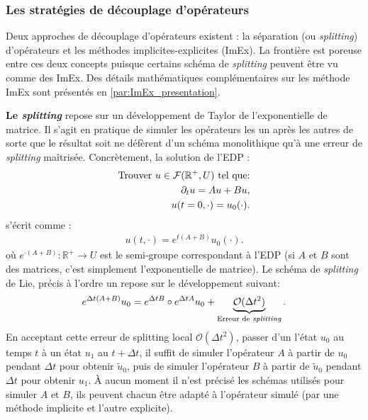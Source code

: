     \subsubsection{Les stratégies de découplage d'opérateurs}
        Deux approches de découplage d'opérateurs existent : la séparation (ou \textit{splitting}) d'opérateurs et les méthodes implicites-explicites (ImEx).
        La frontière est poreuse entre ces deux concepts puisque certains schéma de \textit{splitting} peuvent être vu comme des ImEx. 
        Des détails mathématiques complémentaires sur les méthode ImEx sont présentés en \ref{par:ImEx_presentation}.\par
        \textbf{Le \textit{splitting}} repose sur un développement de Taylor de l'exponentielle de matrice.
        Il s'agit en pratique de simuler les opérateurs les un après les autres de sorte que le résultat soit ne défèrent d'un schéma monolithique
        qu'à une erreur de \textit{splitting} maîtrisée.
        Concrètement, la solution de l'EDP :
        \begin{align}
            \notag\text{Trouver }u \in \mathcal F (\mathbb R^+,U) \text{ tel que:}\\
            \partial_t u = Au + Bu,\\\notag
            u(t=0,\cdot) = u_0(\cdot).
        \end{align}            
        s'écrit comme :
        \begin{align}
            u(t,\cdot) = e^{t(A+B)}u_0(\cdot).
        \end{align}
        où $e^{\cdot(A+B)} : \mathbb R^+ \rightarrow U$ est le semi-groupe correspondant à l'EDP (si $A$ et $B$ sont des matrices, c'est simplement l’exponentielle de matrice).
        Le schéma de \textit{splitting} de Lie, précis à l'ordre un repose sur le développement suivant:
        \begin{align}
            e^{\Delta t(A+B)}u_0 = e^{\Delta tB} \circ e^{\Delta tA}u_0 + \underbrace{\mathcal O (\Delta t^2)}_{\text{Erreur de \textit{splitting}}}.
        \end{align}
        En acceptant cette erreur de splitting local $ \mathcal O (\Delta t^2)$, passer d'un l'état $u_0$ au temps $t$ à un état $u_1$ au $t+\Delta t$, 
        il suffit de simuler l'opérateur $A$ à partir de $u_0$ pendant $\Delta t$ pour obtenir $\tilde{u}_0$,
        puis de simuler l'opérateur $B$ à partir de $\tilde{u}_0$ pendant $\Delta t$ pour obtenir $u_1$.
        À aucun moment il n'est précisé les schémas utilisés pour simuler $A$ et $B$, ils peuvent chacun être adapté à l'opérateur simulé (par une méthode implicite et l'autre explicite).
